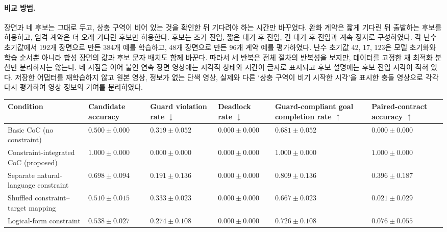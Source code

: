 \paragraph{비교 방법.}
장면과 네 후보는 그대로 두고, 상충 구역이 비어 있는 것을 확인한 뒤 기다려야 하는 시간만 바꾸었다. 완화 계약은 짧게 기다린 뒤 출발하는 후보를 허용하고, 엄격 계약은 더 오래 기다린 후보만 허용한다. 후보는 조기 진입, 짧은 대기 후 진입, 긴 대기 후 진입과 계속 정지로 구성하였다. 각 난수 초기값에서 192개 장면으로 만든 384개 예를 학습하고, 48개 장면으로 만든 96개 계약 예를 평가하였다. 난수 초기값 42, 17, 123은 모델 초기화와 학습 순서뿐 아니라 합성 장면의 값과 후보 문자 배치도 함께 바꾼다. 따라서 세 반복은 전체 절차의 반복성을 보지만, 데이터를 고정한 채 최적화 분산만 분리하지는 않는다. 네 시점을 이어 붙인 연속 장면 영상에는 시각적 상태와 시간이 글자로 표시되고 후보 설명에는 후보 진입 시각이 적혀 있다. 저장한 어댑터를 재학습하지 않고 원본 영상, 정보가 없는 단색 영상, 실제와 다른 `상충 구역이 비기 시작한 시각'을 표시한 충돌 영상으로 각각 다시 평가하여 영상 정보의 기여를 분리하였다.

\begin{table}[!t]
\centering
{}
\label{tab:temporal}
\footnotesize
\begin{tabularx}{\textwidth}{L{0.22\textwidth}ZZZZZ}
\toprule
Condition & Candidate accuracy & Guard violation rate $\downarrow$ & Deadlock rate $\downarrow$ & Guard-compliant goal completion rate $\uparrow$ & Paired-contract accuracy $\uparrow$ \\
\midrule
Basic CoC (no constraint) & $0.500\pm0.000$ & $0.319\pm0.052$ & $0.000\pm0.000$ & $0.681\pm0.052$ & $0.000\pm0.000$ \\
Constraint-integrated CoC (proposed) & $\mathbf{1.000\pm0.000}$ & $\mathbf{0.000\pm0.000}$ & $0.000\pm0.000$ & $\mathbf{1.000\pm0.000}$ & $\mathbf{1.000\pm0.000}$ \\
Separate natural-language constraint & $0.698\pm0.094$ & $0.191\pm0.136$ & $0.000\pm0.000$ & $0.809\pm0.136$ & $0.396\pm0.187$ \\
Shuffled constraint--target mapping & $0.510\pm0.015$ & $0.333\pm0.023$ & $0.000\pm0.000$ & $0.667\pm0.023$ & $0.021\pm0.029$ \\
Logical-form constraint & $0.538\pm0.027$ & $0.274\pm0.108$ & $0.000\pm0.000$ & $0.726\pm0.108$ & $0.076\pm0.055$ \\
\bottomrule
\end{tabularx}
\end{table}

